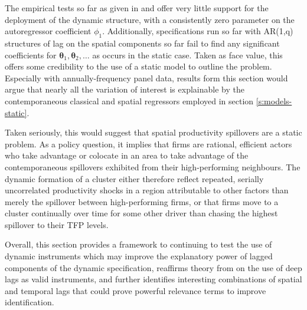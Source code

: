 The empirical tests so far as given in 
and  offer very little support
for the deployment of the dynamic structure,
with a consistently zero parameter on the autoregressor coefficient $\phi_1$.
Additionally, specifications run so far with AR(1,q) structures of lag
on the spatial components so far fail to find any significant
coefficients for $\boldsymbol \theta_1, \boldsymbol\theta_2,\dots$
as occurs in the static case.
Taken as face value, this offers some credibility to the use of
a static model to outline the problem.
Especially with annually-frequency panel data,
results form this section would argue that nearly all the variation
of interest is explainable by the contemporaneous
classical and spatial regressors employed in section \ref{s:models-static}.
\par
Taken seriously, this would suggest that spatial productivity spillovers are a static problem.
As a policy question, it implies that firms are rational, efficient actors
who take advantage or colocate in an area to take advantage of the contemporaneous
spillovers exhibited from their high-performing neighbours.
The dynamic formation of a cluster either therefore reflect
repeated, serially uncorrelated productivity shocks
in a region attributable to other factors than merely the spillover
between high-performing firms,
or that firms move to a cluster continually over time
for some other driver than chasing the highest spillover
to their TFP levels.
\par
Overall, this section provides a framework to continuing to test
the use of dynamic instruments which may improve the explanatory
power of lagged components of the dynamic specification,
reaffirms theory from \cite{Arellano1991} on the use of deep lags as valid instruments,
and further identifies interesting combinations of spatial and temporal lags
that could prove powerful relevance terms to improve identification.
